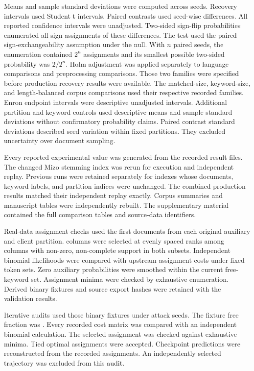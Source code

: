 \documentclass[12pt]{article}
\begin{document}
Means and sample standard deviations were computed across seeds. Recovery intervals used Student t intervals. Paired contrasts used seed-wise differences. All reported confidence intervals were unadjusted. Two-sided sign-flip probabilities enumerated all sign assignments of these differences. The test used the paired sign-exchangeability assumption under the null. With $n$ paired seeds, the enumeration contained $2^n$ assignments and its smallest possible two-sided probability was $2/2^n$. Holm adjustment was applied separately to \LanguageFamily{} language comparisons and \PreprocessingFamily{} preprocessing comparisons. Those two families were specified before production recovery results were available. The matched-size, keyword-size, and length-balanced corpus comparisons used their respective recorded families. Enron endpoint intervals were descriptive unadjusted intervals. Additional partition and keyword controls used descriptive means and sample standard deviations without confirmatory probability claims. Paired contrast standard deviations described seed variation within fixed partitions. They excluded uncertainty over document sampling.

Every reported experimental value was generated from the recorded result files. The changed Mizo stemming index was rerun for execution and independent replay. Previous runs were retained separately for indexes whose documents, keyword labels, and partition indices were unchanged. The combined production results matched their independent replay exactly. Corpus summaries and manuscript tables were independently rebuilt. The supplementary material contained the full comparison tables and source-data identifiers.

Real-data assignment checks used the first \IndependentDocuments{} documents from each original auxiliary and client partition. \IndependentKeywords{} columns were selected at evenly spaced ranks among columns with non-zero, non-complete support in both subsets. Independent binomial likelihoods were compared with upstream assignment costs under fixed token sets. Zero auxiliary probabilities were smoothed within the current free-keyword set. Assignment minima were checked by exhaustive enumeration. Derived binary fixtures and source export hashes were retained with the validation results.

Iterative audits used those binary fixtures under \IterativeSeeds{} attack seeds. The fixture free fraction was \IterativeFreeFraction{}. Every recorded cost matrix was compared with an independent binomial calculation. The selected assignment was checked against exhaustive minima. Tied optimal assignments were accepted. Checkpoint predictions were reconstructed from the recorded assignments. An independently selected trajectory was excluded from this audit.
\end{document}
